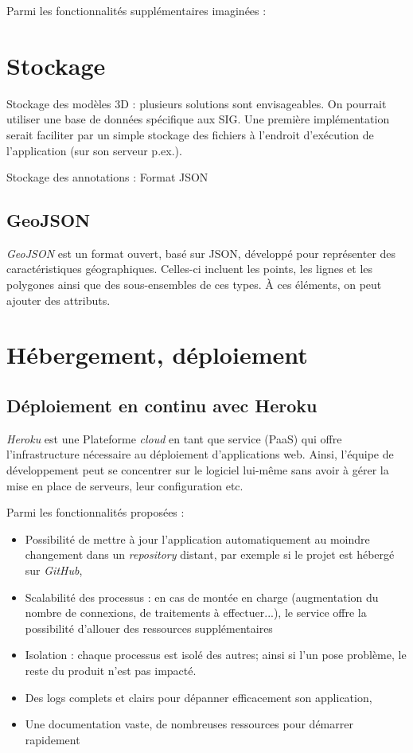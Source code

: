 Parmi les fonctionnalités supplémentaires imaginées :




\section{Stockage}
Stockage des modèles 3D :
plusieurs solutions sont envisageables. On pourrait utiliser une base de données spécifique aux SIG.
Une première implémentation serait faciliter par un simple stockage des fichiers à l'endroit d'exécution de l'application (sur son serveur p.ex.).


Stockage des annotations :
Format JSON

\subsection{GeoJSON}
\textit{GeoJSON} est un format ouvert,  basé sur JSON, développé pour représenter des caractéristiques géographiques.
Celles-ci incluent les points, les lignes et les polygones ainsi que des sous-ensembles de ces types. À ces éléments, on peut ajouter des attributs.



\section{Hébergement, déploiement}

\subsection{Déploiement en continu avec Heroku}

\textit{Heroku} est une Plateforme \textit{cloud} en tant que service (PaaS) qui offre l'infrastructure nécessaire au déploiement d'applications web. Ainsi, l'équipe de développement peut se concentrer sur le logiciel lui-même sans avoir à gérer la mise en place de serveurs, leur configuration etc.

Parmi les fonctionnalités proposées :
\begin{itemize}
    \item Possibilité de mettre à jour l'application automatiquement au moindre changement dans un \textit{repository} distant, par exemple si le projet est hébergé sur \textit{GitHub},
    \item Scalabilité des processus : en cas de montée en charge (augmentation du nombre de connexions, de traitements à effectuer...), le service offre la possibilité d'allouer des ressources supplémentaires
    \item Isolation : chaque processus est isolé des autres; ainsi si l'un pose problème, le reste du produit n'est pas impacté.
    \item Des logs complets et clairs pour dépanner efficacement son application,
    \item Une documentation vaste, de nombreuses ressources pour démarrer rapidement
\end{itemize}

